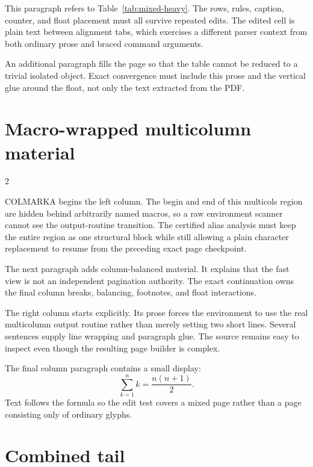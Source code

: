 \documentclass[11pt,a4paper]{article}
\newcommand\OpenEvidenceColumns{\setlength{\columnsep}{18pt}\begin{multicols}{2}}
\newcommand\CloseEvidenceColumns{\end{multicols}}
\begin{document}
This paragraph refers to Table~\ref{tab:mixed-heavy}. The rows, rules,
caption, counter, and float placement must all survive repeated edits. The
edited cell is plain text between alignment tabs, which exercises a different
parser context from both ordinary prose and braced command arguments.

An additional paragraph fills the page so that the table cannot be reduced
to a trivial isolated object. Exact convergence must include this prose and
the vertical glue around the float, not only the text extracted from the PDF.

\clearpage

\section{Macro-wrapped multicolumn material}

\OpenEvidenceColumns

COLMARKA begins the left column. The begin and end of this multicols region
are hidden behind arbitrarily named macros, so a raw environment scanner
cannot see the output-routine transition. The certified alias analysis must
keep the entire region as one structural block while still allowing a plain
character replacement to resume from the preceding exact page checkpoint.

The next paragraph adds column-balanced material. It explains that the fast
view is not an independent pagination authority. The exact continuation owns
the final column breaks, balancing, footnotes, and float interactions.

\columnbreak

The right column starts explicitly. Its prose forces the environment to use
the real multicolumn output routine rather than merely setting two short
lines. Several sentences supply line wrapping and paragraph glue. The source
remains easy to inspect even though the resulting page builder is complex.

The final column paragraph contains a small display:
\[
  \sum_{k=1}^{n} k = \frac{n(n+1)}{2}.
\]
Text follows the formula so the edit test covers a mixed page rather than a
page consisting only of ordinary glyphs.

\CloseEvidenceColumns

\clearpage

\section{Combined tail}
\end{document}
